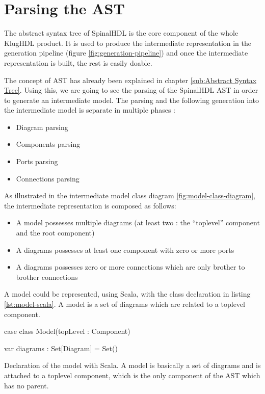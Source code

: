 \chapter{Parsing the AST}
\label{chap:parsing-ast}

The abstract syntax tree of SpinalHDL is the core component of the whole KlugHDL
product. It is used to produce the intermediate representation in the generation
pipeline (figure \ref{fig:generation-pipeline}) and once the intermediate
representation is built, the rest is easily doable.

The concept of AST has already been explained in chapter \ref{sub:Abstract Syntax
  Tree}. Using this, we are going to see the parsing of the SpinalHDL AST in
order to generate an intermediate model. The parsing and the following
generation into the intermediate model is separate in multiple
phases :

\begin{itemize}
\item Diagram parsing
\item Components parsing
\item Ports parsing
\item Connections parsing
\end{itemize}

As illustrated in the intermediate model class diagram
\ref{fig:model-class-diagram}, the intermediate representation is composed as follows:
\begin{itemize}
\item A model possesses multiple diagrams (at least two : the ``toplevel'' component and the
  root component)
\item A diagrams possesses at least one component with zero or more ports
\item A diagrams possesses zero or more connections which are only brother to
  brother connections
\end{itemize}

A model could be represented, using Scala, with the class declaration in listing
\ref{lst:model-scala}. A model is a set of diagrams which are related to a
toplevel component.

\begin{listing}[H]
  \centering
  \begin{scalacode}
    case class Model(topLevel : Component) {

      var diagrams : Set[Diagram] = Set()
  }
\end{scalacode}
\caption[Model class declaration]{Declaration of the model with Scala. A model
  is basically a set of diagrams and is attached to a toplevel component, which
  is the only component of the AST which has no parent.}
\label{lst:model-scala}
\end{listing}

